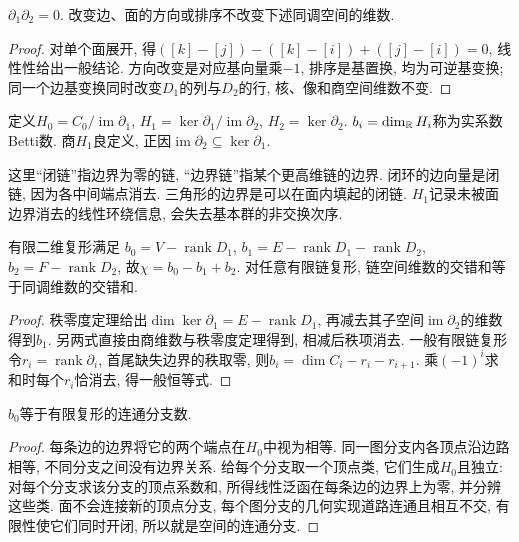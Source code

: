 \begin{proposition}\label{thm:boundary-square}
$\partial_1\partial_2=0$. 改变边、面的方向或排序不改变下述同调空间的维数.
\end{proposition}
\begin{proof}
对单个面展开, 得$([k]-[j])-([k]-[i])+([j]-[i])=0$, 线性性给出一般结论. 方向改变是对应基向量乘$-1$, 排序是基置换, 均为可逆基变换; 同一个边基变换同时改变$D_1$的列与$D_2$的行, 核、像和商空间维数不变.
\end{proof}

\begin{definition}
定义$H_0=C_0/\operatorname{im}\partial_1$, $H_1=\ker\partial_1/\operatorname{im}\partial_2$, $H_2=\ker\partial_2$. $b_i=\dim_\mathbb R H_i$称为实系数Betti数. 商$H_1$良定义, 正因$\operatorname{im}\partial_2\subseteq\ker\partial_1$.
\end{definition}
这里“闭链”指边界为零的链, “边界链”指某个更高维链的边界. 闭环的边向量是闭链, 因为各中间端点消去. 三角形的边界是可以在面内填起的闭链. $H_1$记录未被面边界消去的线性环绕信息, 会失去基本群的非交换次序.

\begin{theorem}\label{thm:euler-poincare}
有限二维复形满足
$b_0=V-\operatorname{rank}D_1$,
$b_1=E-\operatorname{rank}D_1-\operatorname{rank}D_2$,
$b_2=F-\operatorname{rank}D_2$,
故$\chi=b_0-b_1+b_2$.
对任意有限链复形, 链空间维数的交错和等于同调维数的交错和.
\end{theorem}
\begin{proof}
秩零度定理给出$\dim\ker\partial_1=E-\operatorname{rank}D_1$, 再减去其子空间$\operatorname{im}\partial_2$的维数得到$b_1$. 另两式直接由商维数与秩零度定理得到, 相减后秩项消去. 一般有限链复形令$r_i=\operatorname{rank}\partial_i$, 首尾缺失边界的秩取零, 则$b_i=\dim C_i-r_i-r_{i+1}$. 乘$(-1)^i$求和时每个$r_i$恰消去, 得一般恒等式.
\end{proof}

\begin{proposition}
$b_0$等于有限复形的连通分支数.
\end{proposition}
\begin{proof}
每条边的边界将它的两个端点在$H_0$中视为相等. 同一图分支内各顶点沿边路相等, 不同分支之间没有边界关系. 给每个分支取一个顶点类, 它们生成$H_0$且独立: 对每个分支求该分支的顶点系数和, 所得线性泛函在每条边的边界上为零, 并分辨这些类. 面不会连接新的顶点分支, 每个图分支的几何实现道路连通且相互不交, 有限性使它们同时开闭, 所以就是空间的连通分支.
\end{proof}


